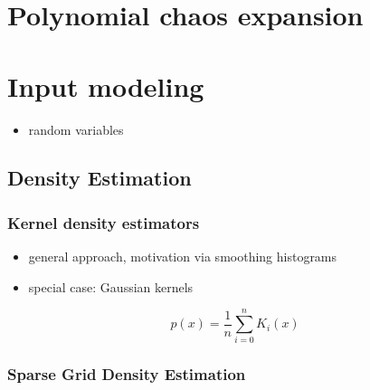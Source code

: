 \chapter{Polynomial chaos expansion}
\label{cha:polyn-chaos-expans}



\chapter{Input modeling}
\label{cha:input-modeling}

\begin{itemize}
\item random variables
\end{itemize}

\blindtext
\blindtext
\blindtext
\blindtext
\blindtext
\blindtext
\blindtext
\blindtext
\blindtext
\blindtext
\blindtext
\blindtext
\blindtext
\blindtext
\blindtext
\blindtext

\section{Density Estimation}
\label{sec:}

\blindtext
\blindtext
\blindtext
\blindtext
\blindtext
\blindtext
\blindtext
\blindtext
\blindtext
\blindtext
\blindtext
\blindtext
\blindtext
\blindtext
\blindtext
\blindtext

\subsection{Kernel density estimators}
\label{sec:kern-dens-estim}

\blindtext
\blindtext
\blindtext
\blindtext
\blindtext
\blindtext
\blindtext
\blindtext
\blindtext
\blindtext
\blindtext
\blindtext
\blindtext
\blindtext
\blindtext
\blindtext


\begin{itemize}
\item general approach, motivation via smoothing histograms
\item special case: Gaussian kernels
\end{itemize}

\begin{equation}
  p(x) = \frac{1}{n} \sum_{i = 0}^n K_i(x)
\end{equation}

\subsection{Sparse Grid Density Estimation}
\label{sec:sparse-grid-density}

